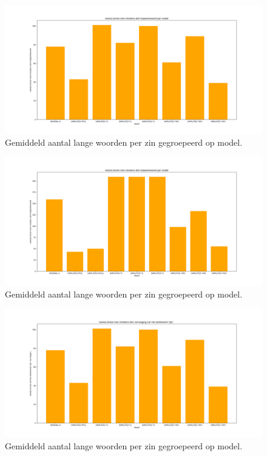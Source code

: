 \begin{figure}
	\includegraphics[width=\linewidth]{img/boxplot-aux-a1.png}
	\caption{Gemiddeld aantal lange woorden per zin gegroepeerd op model.}
	\label{img:histplot-aux-a1}
\end{figure}

\begin{figure}
	\includegraphics[width=\linewidth]{img/boxplot-aux-a2.png}
	\caption{Gemiddeld aantal lange woorden per zin gegroepeerd op model.}
	\label{img:histplot-aux-a2}
\end{figure}


\begin{figure}
	\includegraphics[width=\linewidth]{img/boxplot-tobe-a1.png}
	\caption{Gemiddeld aantal lange woorden per zin gegroepeerd op model.}
	\label{img:histplot-tobe-a1}
\end{figure}

